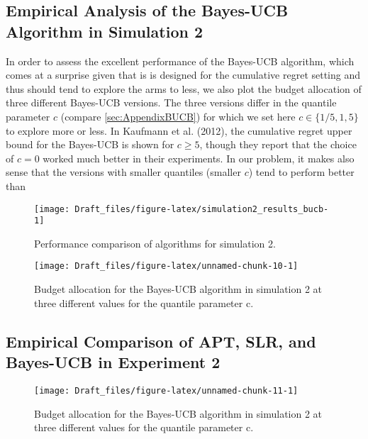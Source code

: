 \documentclass[11pt,]{article}
\begin{document}
\DecMargin{1em}

\subsection{Empirical Analysis of the Bayes-UCB Algorithm in Simulation
2}\label{empirical-analysis-of-the-bayes-ucb-algorithm-in-simulation-2}

In order to assess the excellent performance of the Bayes-UCB algorithm,
which comes at a surprise given that is is designed for the cumulative
regret setting and thus should tend to explore the arms to less, we also
plot the budget allocation of three different Bayes-UCB versions. The
three versions differ in the quantile parameter \(c\) (compare
\autoref{sec:AppendixBUCB}) for which we set here
\(c \in \{1/5, 1, 5\}\) to explore more or less. In Kaufmann et al.
(2012), the cumulative regret upper bound for the Bayes-UCB is shown for
\(c\geq 5\), though they report that the choice of \(c=0\) worked much
better in their experiments. In our problem, it makes also sense that
the versions with smaller quantiles (smaller \(c\)) tend to perform
better than

\begin{figure}

{\centering \texttt{[image: Draft\_files/figure-latex/simulation2\_results\_bucb-1]} 

}

\caption{Performance comparison of algorithms for simulation 2.}\label{fig:simulation2_results_bucb}
\end{figure}

\begin{figure}

{\centering \texttt{[image: Draft\_files/figure-latex/unnamed-chunk-10-1]} 

}

\caption{Budget allocation for the Bayes-UCB algorithm in simulation 2 at three different values for the quantile parameter c.}\label{fig:unnamed-chunk-10}
\end{figure}

\subsection{Empirical Comparison of APT, SLR, and Bayes-UCB in
Experiment
2}\label{empirical-comparison-of-apt-slr-and-bayes-ucb-in-experiment-2}

\begin{figure}

{\centering \texttt{[image: Draft\_files/figure-latex/unnamed-chunk-11-1]} 

}

\caption{Budget allocation for the Bayes-UCB algorithm in simulation 2 at three different values for the quantile parameter c.}\label{fig:unnamed-chunk-11}
\end{figure}
\end{document}
